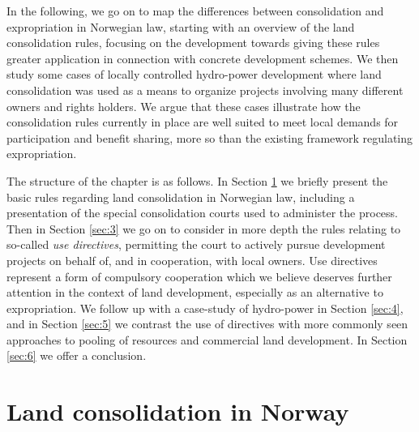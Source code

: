In the following, we go on to map the differences between consolidation and expropriation in Norwegian law, starting with an overview of the land consolidation rules, focusing on the development towards giving these rules greater application in connection with concrete development schemes. We then study some cases of locally controlled hydro-power development where land consolidation was used as a means to organize projects involving many different owners and rights holders. We argue that these cases illustrate how the consolidation rules currently in place are well suited to meet local demands for participation and benefit sharing, more so than the existing framework regulating expropriation.

The structure of the chapter is as follows. In Section \ref{sec:2} we briefly present the basic rules regarding land consolidation in Norwegian law, including a presentation of the special consolidation courts used to administer the process. Then in Section \ref{sec:3} we go on to consider in more depth the rules relating to so-called \emph{use directives}, permitting the court to actively pursue development projects on behalf of, and in cooperation, with local owners. Use directives represent a form of compulsory cooperation which we believe deserves further attention in the context of land development, especially as an alternative to expropriation. We follow up with a case-study of hydro-power in Section \ref{sec:4}, and in Section \ref{sec:5} we contrast the use of directives with more commonly seen approaches to pooling of resources and commercial land development. In Section \ref{sec:6} we offer a conclusion.

\section{Land consolidation in Norway}\label{sec:2}

